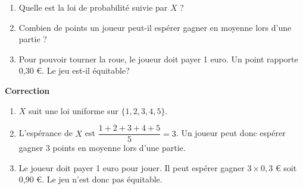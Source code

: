 \documentclass[a4paper,11pt,exos]{nsi} %
\begin{document}
\maketitle


{
}
\begin{enumerate}
    \item Quelle est la loi de probabilité suivie par $X$ ?
    \item Combien de points un joueur peut-il espérer gagner en moyenne lors d'une partie ?
    \item Pour pouvoir tourner la roue, le joueur doit payer 1 euro. Un point rapporte 0,30 €. Le jeu est-il équitable?
\end{enumerate}

\textcolor{UGLiBlue}{\textbf{Correction}
\begin{enumerate}
    \item $X$ suit une loi uniforme sur $\{1,2,3,4,5\}$.
    \item L'espérance de $X$ est $\dfrac{1+2+3+4+5}{5}=3$. Un joueur peut donc espérer gagner 3 points en moyenne lors d'une partie.
    \item Le joueur doit payer 1 euro pour jouer. Il peut espérer gagner $3\times 0,3$ € soit 0,90 €. Le jeu n'est donc pas équitable.\\
\end{enumerate}}

\end{document}
